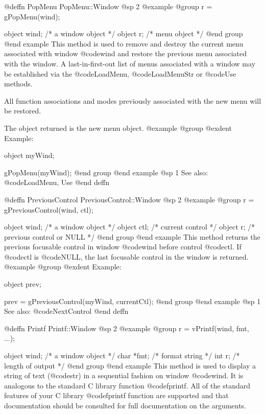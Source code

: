 @deffn {PopMenu} PopMenu::Window
@sp 2
@example
@group
r = gPopMenu(wind);

object   wind;  /*  a window object  */
object   r;     /*  menu object      */
@end group
@end example
This method is used to remove and destroy the current menu associated
with window @code{wind} and restore the previous menu associated with
the window.  A last-in-first-out list of menus associated with a window
may be established via the @code{LoadMenu}, @code{LoadMenuStr} or
@code{Use} methods.

All function associations and modes previously associated with the
new menu will be restored.

The object returned is the new menu object.
@example
@group
@exdent Example:

object  myWind;

gPopMenu(myWind);
@end group
@end example
@sp 1
See also:  @code{LoadMenu, Use}
@end deffn











@deffn {PreviousControl} PreviousControl::Window
@sp 2
@example
@group
r = gPreviousControl(wind, ctl);

object  wind;   /*  a window object          */
object  ctl;    /*  current control          */
object  r;      /*  previous control or NULL */
@end group
@end example
This method returns the previous focusable control in window
@code{wind} before control @code{ctl}.  If @code{ctl} is
@code{NULL}, the last focusable control in the window is returned.
@example
@group
@exdent Example:

object  prev;

prev = gPreviousControl(myWind, currentCtl);
@end group
@end example
@sp 1
See also:  @code{NextControl}
@end deffn




@deffn {Printf} Printf::Window
@sp 2
@example
@group
r = vPrintf(wind, fmt, ...);

object   wind;  /*  a window object       */
char    *fmt;   /*  format string         */
int      r;     /*  length of output      */
@end group
@end example
This method is used to display a string of text (@code{str}) in a sequential
fashion on window @code{wind}.  It is analogous to the standard C library
function @code{fprintf}.  All of the standard features of your C library
@code{fprintf} function are supported and that documentation should be
consulted for full documentation on the arguments.


